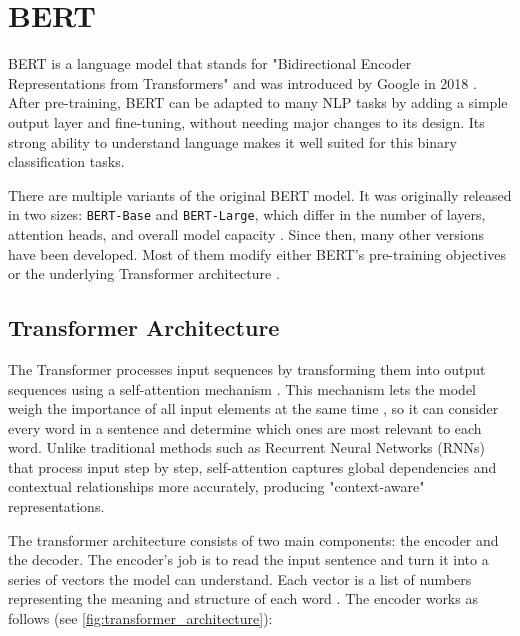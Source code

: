 \section{BERT}
    BERT is a language model that stands for "Bidirectional Encoder Representations from Transformers" and was introduced by Google in 2018 \parencite{devlinBERTPretrainingDeep2019}. After pre-training, BERT can be adapted to many NLP tasks by adding a simple output layer and fine-tuning, without needing major changes to its design. Its strong ability to understand language makes it well suited for this binary classification tasks.

    There are multiple variants of the original BERT model. It was originally released in two sizes: \texttt{BERT-Base} and \texttt{BERT-Large}, which differ in the number of layers, attention heads, and overall model capacity \parencite{devlinBERTPretrainingDeep2019}. Since then, many other versions have been developed. Most of them modify either BERT’s pre-training objectives or the underlying Transformer architecture \parencite{libovickyHowLanguageNeutralMultilingual2019}.

\subsection{Transformer Architecture} \label{subsection:transformer_arch}
    The Transformer processes input sequences by transforming them into output sequences using a self-attention mechanism \parencite{phuongFormalAlgorithmsTransformers2022}. This mechanism lets the model weigh the importance of all input elements at the same time \parencite{xiaoIntroductionTransformersNLP2023}, so it can consider every word in a sentence and determine which ones are most relevant to each word. Unlike traditional methods such as Recurrent Neural Networks (RNNs) that process input step by step, self-attention captures global dependencies and contextual relationships more accurately, producing "context-aware" representations.

    The transformer architecture consists of two main components: the encoder and the decoder. The encoder’s job is to read the input sentence and turn it into a series of vectors the model can understand. Each vector is a list of numbers representing the meaning and structure of each word \parencite{xiaoIntroductionTransformersNLP2023}. The encoder works as follows (see \autoref{fig:transformer_architecture}):

